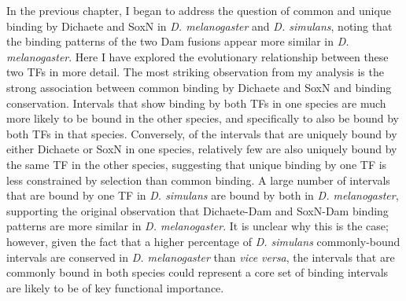 In the previous chapter, I began to address the question of common and unique binding by Dichaete and SoxN in \emph{D. melanogaster} and \emph{D. simulans}, noting that the binding patterns of the two Dam fusions appear more similar in \emph{D. melanogaster}. Here I have explored the evolutionary relationship between these two TFs in more detail. The most striking observation from my analysis is the strong association between common binding by Dichaete and SoxN and binding conservation. Intervals that show binding by both TFs in one species are much more likely to be bound in the other species, and specifically to also be bound by both TFs in that species. Conversely, of the intervals that are uniquely bound by either Dichaete or SoxN in one species, relatively few are also uniquely bound by the same TF in the other species, suggesting that unique binding by one TF is less constrained by selection than common binding. A large number of intervals that are bound by one TF in \emph{D. simulans} are bound by both in \emph{D. melanogaster}, supporting the original observation that Dichaete-Dam and SoxN-Dam binding patterns are more similar in \emph{D. melanogaster}. It is unclear why this is the case; however, given the fact that a higher percentage of \emph{D. simulans} commonly-bound intervals are conserved in \emph{D. melanogaster} than \emph{vice versa}, the intervals that are commonly bound in both species could represent a core set of binding intervals are likely to be of key functional importance.\\

